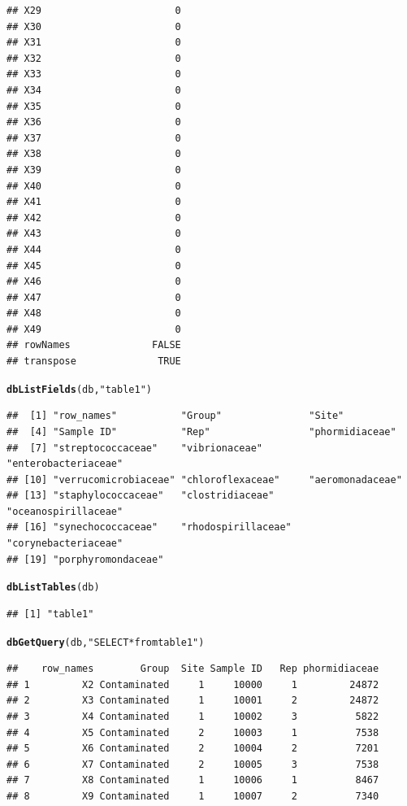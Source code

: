 \documentclass[12pt]{beamer}\usepackage[]{graphicx}\usepackage[]{color}
\makeatletter
\newcommand{\hlstr}[1]{\textcolor[rgb]{0.192,0.494,0.8}{#1}}%
\newcommand{\hlstd}[1]{\textcolor[rgb]{0.345,0.345,0.345}{#1}}%
\newcommand{\hlkwd}[1]{\textcolor[rgb]{0.737,0.353,0.396}{\textbf{#1}}}%
\newenvironment{kframe}{%
 \def\at@end@of@kframe{}%
 \ifinner\ifhmode%
  \def\at@end@of@kframe{\end{minipage}}%
  \begin{minipage}{\columnwidth}%
 \fi\fi%
 \def\FrameCommand##1{\hskip\@totalleftmargin \hskip-\fboxsep
 \colorbox{shadecolor}{##1}\hskip-\fboxsep
     \hskip-\linewidth \hskip-\@totalleftmargin \hskip\columnwidth}%
 \MakeFramed {\advance\hsize-\width
   \@totalleftmargin\z@ \linewidth\hsize
   \@setminipage}}%
 {\par\unskip\endMakeFramed%
 \at@end@of@kframe}
\newenvironment{knitrout}{}{} %
\makeatother
\begin{document}
\begin{frame}[fragile]
\begin{knitrout}
\begin{kframe}
\begin{verbatim}
## X29                       0
## X30                       0
## X31                       0
## X32                       0
## X33                       0
## X34                       0
## X35                       0
## X36                       0
## X37                       0
## X38                       0
## X39                       0
## X40                       0
## X41                       0
## X42                       0
## X43                       0
## X44                       0
## X45                       0
## X46                       0
## X47                       0
## X48                       0
## X49                       0
## rowNames              FALSE
## transpose              TRUE
\end{verbatim}
\begin{alltt}
\hlkwd{dbListFields}\hlstd{(db,}\hlstr{"table1"}\hlstd{)}
\end{alltt}
\begin{verbatim}
##  [1] "row_names"           "Group"               "Site"               
##  [4] "Sample ID"           "Rep"                 "phormidiaceae"      
##  [7] "streptococcaceae"    "vibrionaceae"        "enterobacteriaceae" 
## [10] "verrucomicrobiaceae" "chloroflexaceae"     "aeromonadaceae"     
## [13] "staphylococcaceae"   "clostridiaceae"      "oceanospirillaceae" 
## [16] "synechococcaceae"    "rhodospirillaceae"   "corynebacteriaceae" 
## [19] "porphyromondaceae"
\end{verbatim}
\begin{alltt}
\hlkwd{dbListTables}\hlstd{(db)}
\end{alltt}
\begin{verbatim}
## [1] "table1"
\end{verbatim}
\begin{alltt}
\hlkwd{dbGetQuery}\hlstd{(db,} \hlstr{"SELECT * from table1"}\hlstd{)}
\end{alltt}
\begin{verbatim}
##    row_names        Group  Site Sample ID   Rep phormidiaceae
## 1         X2 Contaminated     1     10000     1         24872
## 2         X3 Contaminated     1     10001     2         24872
## 3         X4 Contaminated     1     10002     3          5822
## 4         X5 Contaminated     2     10003     1          7538
## 5         X6 Contaminated     2     10004     2          7201
## 6         X7 Contaminated     2     10005     3          7538
## 7         X8 Contaminated     1     10006     1          8467
## 8         X9 Contaminated     1     10007     2          7340

\end{verbatim}
\end{kframe}
\end{knitrout}
\end{frame}
\end{document}

